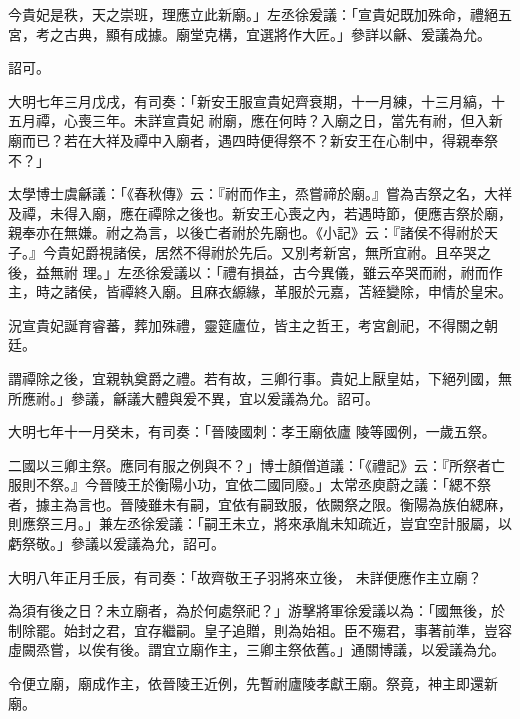 \begin{pinyinscope}
 今貴妃是秩，天之崇班，理應立此新廟。」左丞徐爰議：「宣貴妃既加殊命，禮絕五宮，考之古典，顯有成據。廟堂克構，宜選將作大匠。」參詳以龢、爰議為允。



 詔可。



 大明七年三月戊戌，有司奏：「新安王服宣貴妃齊衰期，十一月練，十三月縞，十五月禫，心喪三年。未詳宣貴妃
 祔廟，應在何時？入廟之日，當先有祔，但入新廟而已？若在大祥及禫中入廟者，遇四時便得祭不？新安王在心制中，得親奉祭不？」



 太學博士虞龢議：「《春秋傳》云：『祔而作主，烝嘗禘於廟。』嘗為吉祭之名，大祥及禫，未得入廟，應在禫除之後也。新安王心喪之內，若遇時節，便應吉祭於廟，親奉亦在無嫌。祔之為言，以後亡者祔於先廟也。《小記》云：『諸侯不得祔於天子。』今貴妃爵視諸侯，居然不得祔於先后。又別考新宮，無所宜祔。且卒哭之後，益無祔
 理。」左丞徐爰議以：「禮有損益，古今異儀，雖云卒哭而祔，祔而作主，時之諸侯，皆禫終入廟。且麻衣縓緣，革服於元嘉，苫絰變除，申情於皇宋。



 況宣貴妃誕育睿蕃，葬加殊禮，靈筵廬位，皆主之哲王，考宮創祀，不得關之朝廷。



 謂禫除之後，宜親執奠爵之禮。若有故，三卿行事。貴妃上厭皇姑，下絕列國，無所應祔。」參議，龢議大體與爰不異，宜以爰議為允。詔可。



 大明七年十一月癸未，有司奏：「晉陵國刺：孝王廟依廬
 陵等國例，一歲五祭。



 二國以三卿主祭。應同有服之例與不？」博士顏僧道議：「《禮記》云：『所祭者亡服則不祭。』今晉陵王於衡陽小功，宜依二國同廢。」太常丞庾蔚之議：「緦不祭者，據主為言也。晉陵雖未有嗣，宜依有嗣致服，依闕祭之限。衡陽為族伯緦麻，則應祭三月。」兼左丞徐爰議：「嗣王未立，將來承胤未知疏近，豈宜空計服屬，以虧祭敬。」參議以爰議為允，詔可。



 大明八年正月壬辰，有司奏：「故齊敬王子羽將來立後，
 未詳便應作主立廟？



 為須有後之日？未立廟者，為於何處祭祀？」游擊將軍徐爰議以為：「國無後，於制除罷。始封之君，宜存繼嗣。皇子追贈，則為始祖。臣不殤君，事著前準，豈容虛闕烝嘗，以俟有後。謂宜立廟作主，三卿主祭依舊。」通關博議，以爰議為允。



 令便立廟，廟成作主，依晉陵王近例，先暫祔廬陵孝獻王廟。祭竟，神主即還新廟。




\end{pinyinscope}
